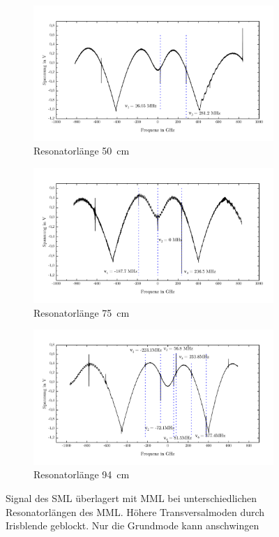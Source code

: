 \documentclass[a4paper,twoside,final]{article}
\begin{document}
\begin{figure}[htp]
  \vspace{-5mm}
  \centering
  \begin{subfigure}{0.8\textwidth}
    \includegraphics[width=\textwidth]{Bilder/mehrereResonatorlaengen_50cm_1Mode.pdf}
    \caption{Resonatorlänge \SI{50}{\centi\meter}}
  \end{subfigure}
  \begin{subfigure}{0.8\textwidth}
    \includegraphics[width=\textwidth]{Bilder/mehrereResonatorlaengen_75cm_1Mode.pdf}
    \caption{Resonatorlänge \SI{75}{\centi\meter}}
  \end{subfigure}
  \begin{subfigure}{0.8\textwidth}
    \includegraphics[width=\textwidth]{Bilder/1TransversaleMode_94cm.pdf}
    \caption{Resonatorlänge \SI{94}{\centi\meter}}
  \end{subfigure}
  \caption{Signal des SML überlagert mit MML bei unterschiedlichen Resonatorlängen des MML. Höhere Transversalmoden durch Irisblende geblockt. Nur die Grundmode kann anschwingen}
  \label{fig:Resonatorveränderung}
\end{figure}
\end{document}
